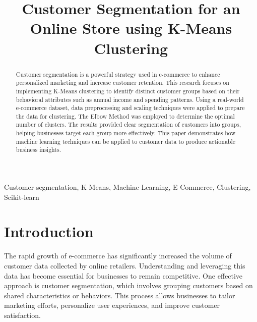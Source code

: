 \documentclass[conference]{IEEEtran}
\begin{document}
\title{Customer Segmentation for an Online Store using K-Means Clustering\\


}

\author{
\and
{}
}

\maketitle

\begin{abstract}
Customer segmentation is a powerful strategy used in e-commerce to enhance personalized marketing and increase customer retention. This research focuses on implementing K-Means clustering to identify distinct customer groups based on their behavioral attributes such as annual income and spending patterns. Using a real-world e-commerce dataset, data preprocessing and scaling techniques were applied to prepare the data for clustering. The Elbow Method was employed to determine the optimal number of clusters. The results provided clear segmentation of customers into groups, helping businesses target each group more effectively. This paper demonstrates how machine learning techniques can be applied to customer data to produce actionable business insights.
\end{abstract}

\begin{IEEEkeywords}
Customer segmentation, K-Means, Machine Learning, E-Commerce, Clustering, Scikit-learn
\end{IEEEkeywords}

\section{Introduction}
The rapid growth of e-commerce has significantly increased the volume of customer data collected by online retailers. Understanding and leveraging this data has become essential for businesses to remain competitive. One effective approach is customer segmentation, which involves grouping customers based on shared characteristics or behaviors. This process allows businesses to tailor marketing efforts, personalize user experiences, and improve customer satisfaction.
\end{document}
